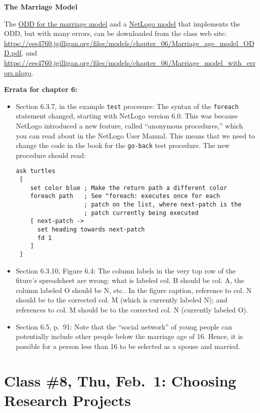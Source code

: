 \documentclass[]{article}
\begin{document}
\textbf{The Marriage Model}

The \href{/files/models/chapter_06/Marriage_age_model_ODD.pdf}{ODD for
the marriage model} and a
\href{files/models/chapter_06/Marriage_model_with_errors.nlogo}{NetLogo
model} that implements the ODD, but with many errors, can be downloaded
from the class web site:
\url{https://ees4760.jgilligan.org/files/models/chapter_06/Marriage_age_model_ODD.pdf},
and
\url{https://ees4760.jgilligan.org/files/models/chapter_06/Marriage_model_with_errors.nlogo}.

\textbf{Errata for chapter 6:}

\begin{itemize}
\item
  Section 6.3.7, in the example \texttt{test} procesure: The syntax of
  the \texttt{foreach} statement changed, starting with NetLogo version
  6.0. This was because NetLogo introduced a new feature, called
  ``anonymous procedures,'' which you can read about in the NetLogo User
  Manual. This means that we need to change the code in the book for the
  \texttt{go-back} test procedure. The new procedure should read:

\begin{verbatim}
ask turtles
 [
    set color blue ; Make the return path a different color
    foreach path   ; See "foreach: executes once for each
                   ; patch on the list, where next-patch is the
                   ; patch currently being executed
    [ next-patch ->
      set heading towards next-patch
      fd 1
    ]
 ]
\end{verbatim}
\item
  Section 6.3.10, Figure 6.4: The column labels in the very top row of
  the fiture's spreadsheet are wrong: what is labeled col. B should be
  col. A, the column labeled O should be N, etc.. In the figure caption,
  reference to col. N should be to the corrected col. M (which is
  currently labeled N); and references to col. M should be to the
  corrected col. N (currently labeled O).
\item
  Section 6.5, p.~91: Note that the ``social network'' of young people
  can potentially include other people below the marriage age of 16.
  Hence, it is possible for a person less than 16 to be selected as a
  spouse and married.
\end{itemize}

\hypertarget{class-8-thu-feb.1-choosing-research-projects}{%
\section{Class \#8, Thu, Feb.~1: Choosing Research
Projects}\label{class-8-thu-feb.1-choosing-research-projects}}
\end{document}
